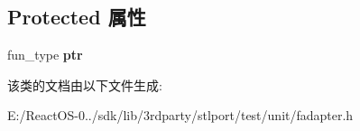 \subsection*{Protected 属性}
\begin{DoxyCompactItemize}
\item 
\mbox{\label{classpointer__to__binary__procedure_aa60064ee7a1a84cfcf55094999107240}} 
fun\+\_\+type {\bfseries ptr}
\end{DoxyCompactItemize}


该类的文档由以下文件生成\+:\begin{DoxyCompactItemize}
\item 
E\+:/\+React\+O\+S-\/0../sdk/lib/3rdparty/stlport/test/unit/fadapter.\+h\end{DoxyCompactItemize}
